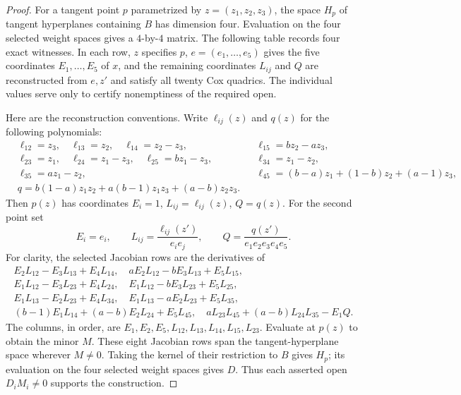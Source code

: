 \documentclass[11pt]{article}
\theoremstyle{remark}
\begin{document}
\begin{proof}

For a tangent point \(p\) parametrized by \(z=(z_1,z_2,z_3)\), the space
\(H_p\) of tangent hyperplanes containing \(B\) has dimension four.
Evaluation on the four selected weight spaces gives a \(4\)-by-\(4\) matrix.
The following table records four exact witnesses.  In each row, \(z\) specifies
\(p\), \(e=(e_1,\ldots,e_5)\) gives the five coordinates
\(E_1,\ldots,E_5\) of \(x\), and the remaining coordinates \(L_{ij}\) and
\(Q\) are reconstructed from \(e,z'\) and satisfy all twenty Cox quadrics.
The individual values serve only to certify nonemptiness of the required open.
\begin{center}
\SliceWitnessTable
\end{center}

Here are the reconstruction conventions.  Write \(\ell_{ij}(z)\) and
\(q(z)\) for the following polynomials:
\[
\begin{aligned}
 &\ell_{12}=z_3,\quad \ell_{13}=z_2,\quad \ell_{14}=z_2-z_3,
 &&\ell_{15}=bz_2-az_3,\\
 &\ell_{23}=z_1,\quad \ell_{24}=z_1-z_3,\quad \ell_{25}=bz_1-z_3,
 &&\ell_{34}=z_1-z_2,\\
 &\ell_{35}=az_1-z_2,
 &&\ell_{45}=(b-a)z_1+(1-b)z_2+(a-1)z_3,\\
 &q=b(1-a)z_1z_2+a(b-1)z_1z_3+(a-b)z_2z_3.
\end{aligned}
\]
Then \(p(z)\) has coordinates \(E_i=1\), \(L_{ij}=\ell_{ij}(z)\),
\(Q=q(z)\).  For the second point set
\[
 E_i=e_i,\qquad L_{ij}=\frac{\ell_{ij}(z')}{e_i e_j},\qquad
 Q=\frac{q(z')}{e_1e_2e_3e_4e_5}.
\]
For clarity, the selected Jacobian rows are the derivatives of
\[
\begin{gathered}
 E_2L_{12}-E_3L_{13}+E_4L_{14},\quad
 aE_2L_{12}-bE_3L_{13}+E_5L_{15},\\
 E_1L_{12}-E_3L_{23}+E_4L_{24},\quad
 E_1L_{12}-bE_3L_{23}+E_5L_{25},\\
 E_1L_{13}-E_2L_{23}+E_4L_{34},\quad
 E_1L_{13}-aE_2L_{23}+E_5L_{35},\\
 (b-1)E_1L_{14}+(a-b)E_2L_{24}+E_5L_{45},\quad
 aL_{23}L_{45}+(a-b)L_{24}L_{35}-E_1Q.
\end{gathered}
\]
The columns, in order, are
\(E_1,E_2,E_5,L_{12},L_{13},L_{14},L_{15},L_{23}\).
Evaluate at \(p(z)\) to obtain the minor \(M\).
These eight Jacobian rows span the tangent-hyperplane space wherever
\(M\ne0\).  Taking the kernel of their restriction to \(B\) gives
\(H_p\); its evaluation on the four selected weight spaces gives \(D\).
Thus each asserted open \(D_iM_i\ne0\) supports the construction.



\end{proof}
\end{document}
